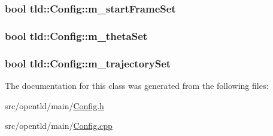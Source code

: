 \hypertarget{classtld_1_1Config_ad687474e03c708cb894c22f3fe945c06}{
\subsubsection[{m\-\_\-start\-Frame\-Set}]{\setlength{\rightskip}{0pt plus 5cm}bool tld\-::\-Config\-::m\-\_\-start\-Frame\-Set\hspace{0.3cm}{\ttfamily [private]}}}\label{classtld_1_1Config_ad687474e03c708cb894c22f3fe945c06}
\hypertarget{classtld_1_1Config_afdb22a0de5e6f0a2bda59be3c01db38c}{
\subsubsection[{m\-\_\-theta\-Set}]{\setlength{\rightskip}{0pt plus 5cm}bool tld\-::\-Config\-::m\-\_\-theta\-Set\hspace{0.3cm}{\ttfamily [private]}}}\label{classtld_1_1Config_afdb22a0de5e6f0a2bda59be3c01db38c}
\hypertarget{classtld_1_1Config_a15524b83cfa73659aad6a2113ccd1b61}{
\subsubsection[{m\-\_\-trajectory\-Set}]{\setlength{\rightskip}{0pt plus 5cm}bool tld\-::\-Config\-::m\-\_\-trajectory\-Set\hspace{0.3cm}{\ttfamily [private]}}}\label{classtld_1_1Config_a15524b83cfa73659aad6a2113ccd1b61}


The documentation for this class was generated from the following files\-:\begin{DoxyCompactItemize}
\item 
src/opentld/main/\hyperlink{Config_8h}{Config.\-h}\item 
src/opentld/main/\hyperlink{Config_8cpp}{Config.\-cpp}\end{DoxyCompactItemize}
